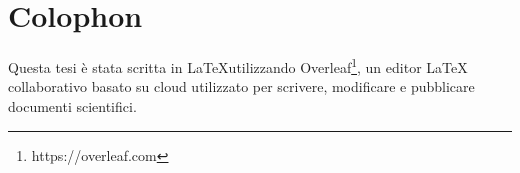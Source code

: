 \chapter*{Colophon}

Questa tesi è stata scritta in \LaTeX utilizzando Overleaf\footnote{https://overleaf.com}, un editor LaTeX collaborativo basato su cloud utilizzato per scrivere, modificare e pubblicare documenti scientifici.\\